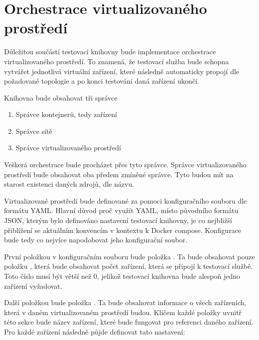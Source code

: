 \section{Orchestrace virtualizovaného prostředí}\label{sec:design_virt}

Důležitou součástí testovací knihovny bude implementace orchestrace virtualizovaného prostředí. To znamená, že testovací služba bude schopna vytvářet jednotlivá virtuální zařízení, které následně automaticky propojí dle požadované topologie a po konci testování daná zařízení ukončí. 

Knihovna bude obsahovat tři správce

\begin{enumerate}
    \item Správce kontejnerů, tedy zařízení
    \item Správce sítě
    \item Správce virtualizovaného prostředí
\end{enumerate}

Veškerá orchestrace bude procházet přes tyto správce. Správce virtualizovaného prostředí bude obsahovat oba předem zmíněné správce. Tyto budou mít na starost existenci daných zdrojů, dle názvu.

Virtualizované prostředí bude definované za pomoci konfiguračního souboru dle formátu YAML. Hlavní důvod proč využít YAML, místo původního formátu JSON, kterým bylo definováno nastavení testovací knihovny, je co nejbližší přiblížení se aktuálním konvencím v kontextu k Docker compose. Konfigurace bude tedy co nejvíce napodobovat jeho konfigurační soubor. 

První položkou v konfiguračním souboru bude položka . Ta bude obsahovat pouze položku , která bude obsahovat počet zařízení, která se připojí k testovací službě. Toto číslo musí být větší než 0, jelikož testovací knihovna bude alespoň jedno zařízení vyžadovat.

Další položkou bude položka . Ta bude obsahovat informace o všech zařízeních, která v daném virtualizovaném prostředí budou. Klíčem každé položky uvnitř této sekce bude název zařízení, které bude fungovat pro referenci daného zařízení. Pro každé zařízení následně půjde definovat tato nastavení: 

